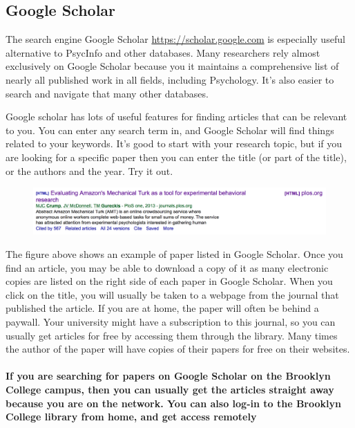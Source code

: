 \subsection{Google Scholar}
The search engine Google Scholar \url{https://scholar.google.com} is especially useful alternative to PsycInfo and other databases. Many researchers rely almost exclusively on Google Scholar because you it maintains a comprehensive list of nearly all published work in all fields, including Psychology. It's also easier to search and navigate that many other databases.

Google scholar has lots of useful features for finding articles that can be relevant to you. You can enter any search term in, and Google Scholar will find things related to your keywords. It's good to start with your research topic, but if you are looking for a specific paper then you can enter the title (or part of the title), or the authors and the year. Try it out.

 \begin{figure}
       \includegraphics[width=1\linewidth]{figures/CrumpPlosOne.png}
       \caption{}
       \label{fig:PlosOne}
 \end{figure}

The figure above shows an example of paper listed in Google Scholar. Once you find an article, you may be able to download a copy of it as many electronic copies are listed on the right side of each paper in Google Scholar. When you click on the title, you will usually be taken to a webpage from the journal that published the article. If you are at home, the paper will often be behind a paywall. Your university might have a subscription to this journal, so you can usually get articles for free by accessing them through the library. Many times the author of the paper will have copies of their papers for free on their websites.

\paragraph{If you are searching for papers on Google Scholar on the Brooklyn College campus, then you can usually get the articles straight away because you are on the network. You can also log-in to the Brooklyn College library from home, and get access remotely}


